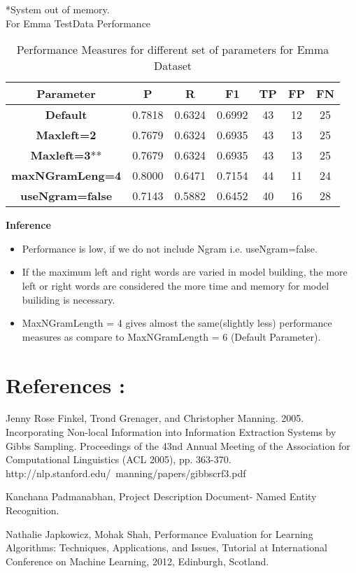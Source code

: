 \documentclass[12pt]{article}
\begin{document}
*System out of memory.\\

For Emma TestData Performance
\begin{table}[ht!]
\centering
\begin{tabular}{ |c|c|c|c|c|c|c|} 
\hline 
 \textbf{Parameter} & \textbf{P} & \textbf{R} & \textbf{F1} &\textbf{TP} &\textbf{FP} & \textbf{FN} \\ [2ex]
\hline 
\textbf{Default} &	0.7818&	0.6324	&0.6992	&43	&12	&25\\ [1ex]
\hline 
\textbf{Maxleft=2} & 0.7679	& 0.6324	& 0.6935 &	43 & 13	 & 25\\ [1ex]
\hline 
\textbf{Maxleft=3}** & 0.7679 & 0.6324	& 0.6935 &	43 & 13	 & 25\\ [1ex]
\hline 
\textbf{maxNGramLeng=4} &0.8000	& 0.6471 &	0.7154 & 44 & 11 & 24\\ [1ex]
\hline 
\textbf{useNgram=false} &0.7143	& 0.5882 & 0.6452 & 40 & 16 & 28\\ [1ex]
\hline 
\end{tabular}
\caption{Performance Measures for different set of parameters for Emma Dataset }
\label{table:14}
\end{table}

\newpage
\textbf{Inference}
\begin{itemize}
\item Performance is low, if we do not include Ngram i.e. useNgram=false.
\item If the maximum left and right words are varied in model building, the more left or right words are considered the more time and memory for model builiding is necessary.
\item MaxNGramLength = 4 gives almost the same(slightly less) performance measures as compare to MaxNGramLength = 6 (Default Parameter).

\end{itemize}

\section{References :} 
\begin{enumerate}[label={[\arabic*]}]
\item  Jenny Rose Finkel, Trond Grenager, and Christopher Manning. 2005. Incorporating Non-local Information into Information Extraction Systems by Gibbs Sampling. Proceedings of the 43nd Annual Meeting of the Association for Computational Linguistics (ACL 2005), pp. 363-370. http://nlp.stanford.edu/~manning/papers/gibbscrf3.pdf
\item  Kanchana Padmanabhan, Project Description Document- Named Entity Recognition.
\item Nathalie Japkowicz, Mohak Shah, Performance Evaluation for Learning Algorithms: Techniques, Applications, and Issues, Tutorial at International Conference on Machine Learning, 2012, Edinburgh, Scotland.

\end{enumerate}
\end{document}
